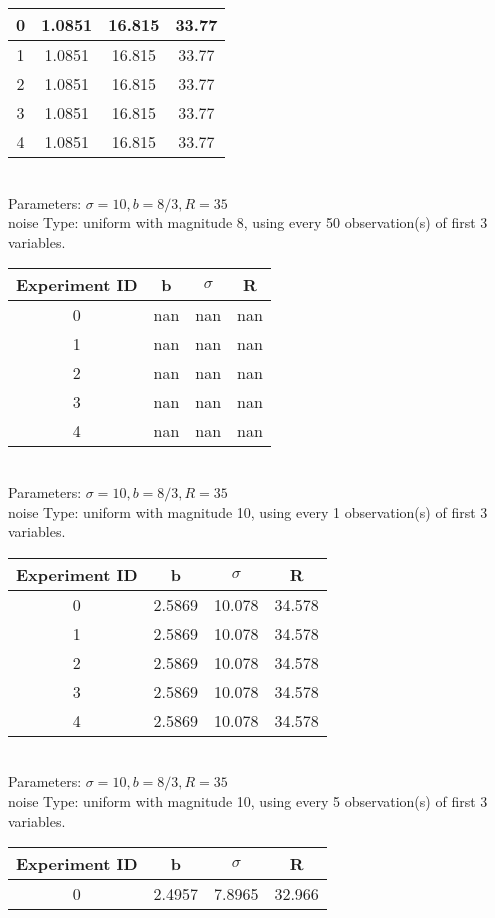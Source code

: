 \begin{multicols}{3}
\begin{tabular}{cccc}
0 & 1.0851 & 16.815 & 33.77\\ \hline 
 1 & 1.0851 & 16.815 & 33.77\\ \hline 
 2 & 1.0851 & 16.815 & 33.77\\ \hline 
 3 & 1.0851 & 16.815 & 33.77\\ \hline 
 4 & 1.0851 & 16.815 & 33.77\\ \hline 
 \end{tabular}\\
Parameters: $\sigma=10, b=8/3, R=35$\\
noise Type: uniform with magnitude 8, using every 50 observation(s) of first 3 variables.\\
\begin{tabular}{cccc}
\hline Experiment ID & b & $\sigma$ & R \\ \hline 
0 & nan & nan & nan\\ \hline 
 1 & nan & nan & nan\\ \hline 
 2 & nan & nan & nan\\ \hline 
 3 & nan & nan & nan\\ \hline 
 4 & nan & nan & nan\\ \hline 
 \end{tabular}\\
Parameters: $\sigma=10, b=8/3, R=35$\\
noise Type: uniform with magnitude 10, using every 1 observation(s) of first 3 variables.\\
\begin{tabular}{cccc}
\hline Experiment ID & b & $\sigma$ & R \\ \hline 
0 & 2.5869 & 10.078 & 34.578\\ \hline 
 1 & 2.5869 & 10.078 & 34.578\\ \hline 
 2 & 2.5869 & 10.078 & 34.578\\ \hline 
 3 & 2.5869 & 10.078 & 34.578\\ \hline 
 4 & 2.5869 & 10.078 & 34.578\\ \hline 
 \end{tabular}\\
Parameters: $\sigma=10, b=8/3, R=35$\\
noise Type: uniform with magnitude 10, using every 5 observation(s) of first 3 variables.\\
\begin{tabular}{cccc}
\hline Experiment ID & b & $\sigma$ & R \\ \hline 
0 & 2.4957 & 7.8965 & 32.966\\ \hline 

\end{tabular}
\end{multicols}
